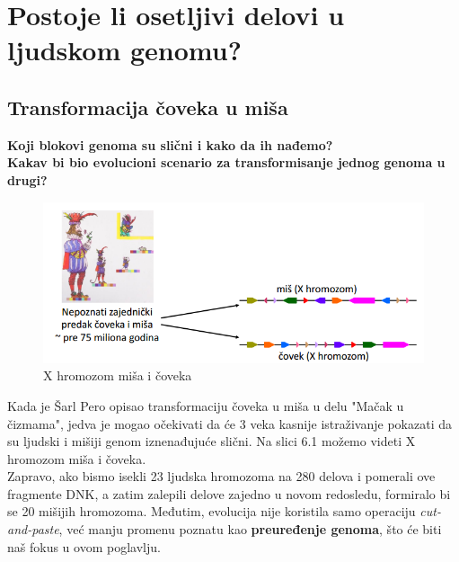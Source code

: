 \chapter {Postoje li osetljivi delovi
u ljudskom genomu?}
\setbookcodestyle

\section{Transformacija čoveka u miša}

\vspace{0.5cm}

\noindent \textbf{Koji blokovi genoma su slični i kako da ih
nađemo?}\\

\noindent \textbf{Kakav bi bio evolucioni scenario za
transformisanje jednog genoma u drugi?}\\

\begin{figure}[h!]
\includegraphics[scale=0.7]{poglavlja/6/slike/predak_X.PNG}
\caption{X hromozom miša i čoveka}
\label{slika:X}
\end{figure}

Kada je Šarl Pero opisao transformaciju čoveka u miša u delu "Mačak u čizmama", jedva je mogao očekivati da će 3 veka kasnije istraživanje pokazati da su ljudski i mišiji genom iznenađujuće slični. Na slici 6.1 možemo videti X hromozom miša i čoveka.\\

Zapravo, ako bismo isekli 23 ljudska hromozoma na 280 delova i pomerali ove fragmente DNK, a zatim zalepili delove zajedno u novom redosledu, formiralo bi se 20 mišijih hromozoma. Međutim, evolucija nije koristila samo operaciju \textit{cut-and-paste}, već manju promenu poznatu kao \textbf{preuređenje genoma}, što će biti naš  fokus u ovom poglavlju.\\

\newpage

